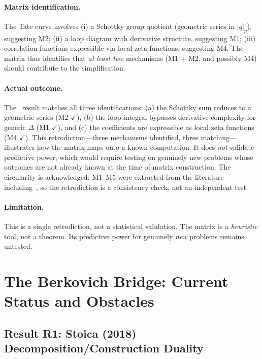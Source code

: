 \documentclass[11pt,a4paper]{article}
\newcommand{\normp}[1]{|#1|_p}
\begin{document}
\paragraph{Matrix identification.}
The Tate curve involves (i) a Schottky group quotient (geometric series in $\normp{q}$), suggesting M2; (ii) a loop diagram with derivative structure, suggesting M1; (iii) correlation functions expressible via local zeta functions, suggesting M4. The matrix thus identifies that \emph{at least two} mechanisms (M1 + M2, and possibly M4) should contribute to the simplification.

\paragraph{Actual outcome.}
The~\cite{HJ24} result matches all three identifications: (a) the Schottky sum reduces to a geometric series (M2 $\checkmark$), (b) the loop integral bypasses derivative complexity for generic $\Delta$ (M1 $\checkmark$), and (c) the coefficients are expressible as local zeta functions (M4 $\checkmark$). This retrodiction---three mechanisms identified, three matching---illustrates how the matrix maps onto a known computation. It does \emph{not} validate predictive power, which would require testing on genuinely new problems whose outcomes are not already known at the time of matrix construction. The circularity is acknowledged: M1--M5 were extracted from the literature including~\cite{HJ24}, so the retrodiction is a consistency check, not an independent test.

\paragraph{Limitation.}
This is a single retrodiction, not a statistical validation. The matrix is a \emph{heuristic} tool, not a theorem. Its predictive power for genuinely \emph{new} problems remains untested.

\section{The Berkovich Bridge: Current Status and Obstacles}
\label{sec:berkovich}

\subsection{Result R1: Stoica (2018) Decomposition/Construction Duality}
\end{document}
